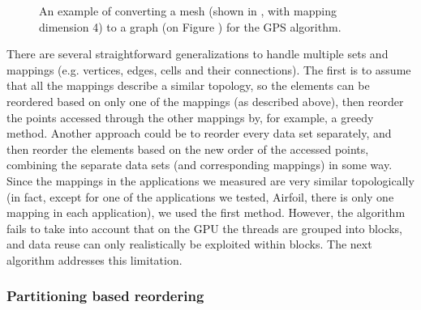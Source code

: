 \begin{figure}%
  \centering%
  \qquad
  \caption[]{An example of converting a mesh (shown in ,
  with mapping dimension 4) to a graph (on Figure ) for
  the GPS algorithm.}%
  \label{fig:mesh2graph}
\end{figure}

There are several straightforward generalizations to handle multiple sets and
mappings (e.g. vertices, edges, cells and their connections).  The first is to
assume that all the mappings describe a similar topology, so the elements can be
reordered based on only one of the mappings (as described above), then reorder 
the points accessed through the other mappings by, for example, a greedy method.
Another approach could be to reorder every data set separately, and then reorder
the elements based on the new order of the accessed points, combining the
separate data sets (and corresponding mappings) in some way. Since the mappings
in the applications we measured are very similar topologically (in fact, except
for one of the applications we tested, Airfoil, there is only one mapping in 
each application), we used the first method. However, the algorithm fails to 
take into account that on the GPU the threads are grouped into blocks, and data 
reuse can only realistically be exploited within blocks. The next algorithm 
addresses this limitation.

\subsubsection{Partitioning based reordering}

